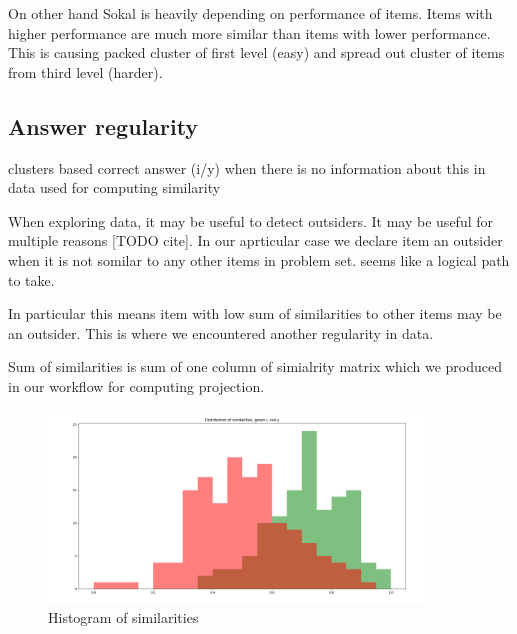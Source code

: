 \documentclass[
  digital, %
  table,   %
  nolof,     %
  nolot,     %
  nocover
]{fithesis3}
\begin{document}
On other hand Sokal is heavily depending on performance of items. Items
with higher performance are much more similar than items with lower
performance. This is causing packed cluster of first level (easy) and
spread out cluster of items from third level (harder).


\subsection{Answer regularity}\label{answer-regularity}

clusters based correct answer (i/y) when there is no information about
this in data used for computing similarity


When exploring data, it may be useful to detect outsiders. It may be
useful for multiple reasons {[}TODO cite{]}. In our aprticular case we
declare item an outsider when it is not somilar to any other items in
problem set. seems like a logical path to take.

In particular this means item with low sum of similarities to other
items may be an outsider. This is where we encountered another
regularity in data.


Sum of similarities is sum of one column of simialrity matrix which we
produced in our workflow for computing projection.

\begin{figure}
  \begin{center}
    \includegraphics[width=10cm]{img/iy_histogram}
  \end{center}
  \caption{Histogram of similarities}
  \label{ref:iyhistogram}
\end{figure}

\end{document}

